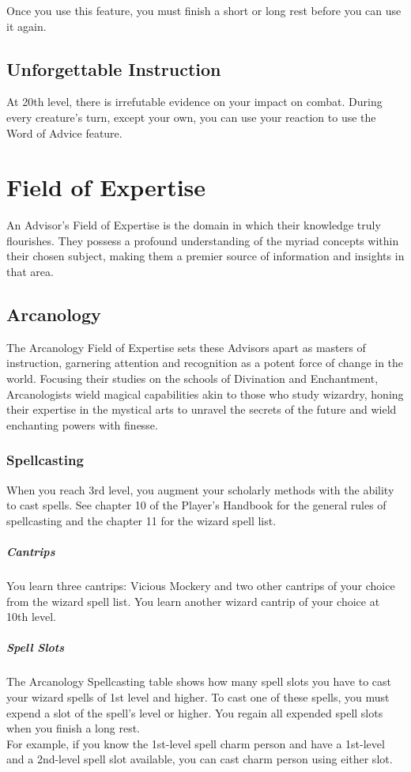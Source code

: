 \documentclass[letterpaper,openany,twoside,twocolumn]{book}
\begin{document}
	Once you use this feature, you must finish a short or long rest before you can use it again.
	
	\subsection*{Unforgettable Instruction}
	At 20th level, there is irrefutable evidence on your impact on combat. During every creature's turn, except your own, you can use your reaction to use the Word of Advice feature.
	
	\section*{Field of Expertise}
	An Advisor's Field of Expertise is the domain in which their knowledge truly flourishes. They possess a profound understanding of the myriad concepts within their chosen subject, making them a premier source of information and insights in that area.
	
	\subsection*{Arcanology}
	The Arcanology Field of Expertise sets these Advisors apart as masters of instruction, garnering attention and recognition as a potent force of change in the world. Focusing their studies on the schools of Divination and Enchantment, Arcanologists wield magical capabilities akin to those who study wizardry, honing their expertise in the mystical arts to unravel the secrets of the future and wield enchanting powers with finesse.
	
	\subsubsection*{Spellcasting}
	When you reach 3rd level, you augment your scholarly methods with the ability to cast spells. See chapter 10 of the Player's Handbook for the general rules of spellcasting and the chapter 11 for the wizard spell list.
	
	\subparagraph*{Cantrips}
	You learn three cantrips: Vicious Mockery and two other cantrips of your choice from the wizard spell list. You learn another wizard cantrip of your choice at 10th level.
	
	\subparagraph*{Spell Slots}
	The Arcanology Spellcasting table shows how many spell slots you have to cast your wizard spells of 1st level and higher. To cast one of these spells, you must expend a slot of the spell's level or higher. You regain all expended spell slots when you finish a long rest.\\
	For example, if you know the 1st-level spell charm person and have a 1st-level and a 2nd-level spell slot available, you can cast charm person using either slot.
\end{document}
